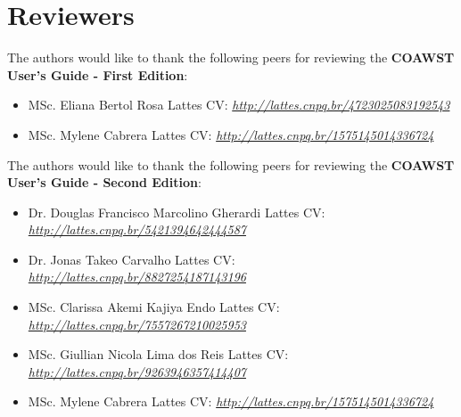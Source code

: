 \chapter*{Reviewers}

\bigskip
\noindent The authors would like to thank the following peers for reviewing the \textbf{COAWST User's Guide  - First Edition}:
\bigskip

\begin{itemize}
    \item MSc. Eliana Bertol Rosa \newline Lattes CV: \textit{\textcolor{bleu_cite}{\href{http://lattes.cnpq.br/4723025083192543}{http://lattes.cnpq.br/4723025083192543}}}
    \bigskip
    \item MSc. Mylene Cabrera \newline Lattes CV: \textit{\textcolor{bleu_cite}{\href{http://lattes.cnpq.br/1575145014336724}{http://lattes.cnpq.br/1575145014336724}}}
\end{itemize}

\bigskip
\bigskip
\noindent The authors would like to thank the following peers for reviewing the \textbf{COAWST User's Guide - Second Edition}:
\bigskip

\begin{itemize}
    \item Dr. Douglas Francisco Marcolino Gherardi \newline Lattes CV: \textit{\textcolor{bleu_cite}{\href{http://lattes.cnpq.br/5421394642444587}{http://lattes.cnpq.br/5421394642444587}}}
    \bigskip
    \item Dr. Jonas Takeo Carvalho \newline Lattes CV: \textit{\textcolor{bleu_cite}{\href{http://lattes.cnpq.br/8827254187143196}{http://lattes.cnpq.br/8827254187143196}}}
    \bigskip
    \item MSc. Clarissa Akemi Kajiya Endo \newline Lattes CV: \textit{\textcolor{bleu_cite}{\href{http://lattes.cnpq.br/7557267210025953}{http://lattes.cnpq.br/7557267210025953}}}
    \bigskip
    \item MSc. Giullian Nicola Lima dos Reis \newline Lattes CV: \textit{\textcolor{bleu_cite}{\href{http://lattes.cnpq.br/9263946357414407}{http://lattes.cnpq.br/9263946357414407}}}
    \bigskip
    \item MSc. Mylene Cabrera \newline Lattes CV: \textit{\textcolor{bleu_cite}{\href{http://lattes.cnpq.br/1575145014336724}{http://lattes.cnpq.br/1575145014336724}}}
\end{itemize}
\newpage


